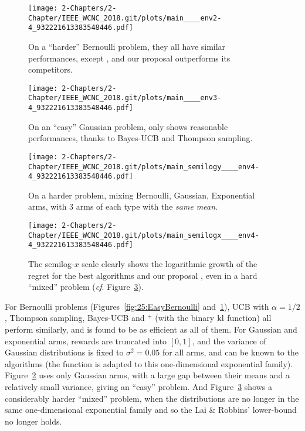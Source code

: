 \begin{figure}[h!]  %
	\centering
	\texttt{[image: 2-Chapters/2-Chapter/IEEE\_WCNC\_2018.git/plots/main\_\_\_\_env2-4\_932221613383548446.pdf]}
	\caption{On a ``harder'' Bernoulli problem, they all have similar performances, except \LearnExp, and our proposal \Aggr{} outperforms its competitors.}
	\label{fig:25:HardBernoulli}
\end{figure}

\begin{figure}[h!]  %
	\centering
	\texttt{[image: 2-Chapters/2-Chapter/IEEE\_WCNC\_2018.git/plots/main\_\_\_\_env3-4\_932221613383548446.pdf]}
	\caption{On an ``easy'' Gaussian problem, only \Aggr{} shows reasonable performances, thanks to Bayes-UCB and Thompson sampling.}
	\label{fig:25:EasyGaussian}
\end{figure}

\begin{figure}[h!]  %
	\centering
	\texttt{[image: 2-Chapters/2-Chapter/IEEE\_WCNC\_2018.git/plots/main\_semilogy\_\_\_\_env4-4\_932221613383548446.pdf]}
	\caption{On a harder problem, mixing Bernoulli, Gaussian, Exponential arms, with 3 arms of each type with the \emph{same mean}.}
	\label{fig:25:HarderMixed}
\end{figure}

\begin{figure}[h!]  %
	\centering
	\texttt{[image: 2-Chapters/2-Chapter/IEEE\_WCNC\_2018.git/plots/main\_semilogx\_\_\_\_env4-4\_932221613383548446.pdf]}
	\caption{The semilog-$x$ scale clearly shows the logarithmic growth of the regret for the best algorithms and our proposal \Aggr, even in a hard ``mixed'' problem (\emph{cf}. Figure~\ref{fig:25:HarderMixed}).}
	\label{fig:25:HarderMixed_semilogx}
\end{figure}

For Bernoulli problems (Figures~\ref{fig:25:EasyBernoulli} and~\ref{fig:25:HardBernoulli}), UCB with $\alpha=1/2$, Thompson sampling, Bayes-UCB and \klUCB{}$^+$ (with the binary $\mathrm{kl}$ function) all perform similarly, and \Aggr{} is found to be as efficient as all of them.
For Gaussian and exponential arms, rewards are truncated into $[0,1]$, and the variance of Gaussian distributions is fixed to $\sigma^2 = 0.05$ for all arms, and can be known to the algorithms (the \kl{} function is adapted to this one-dimensional exponential family).
%
Figure~\ref{fig:25:EasyGaussian} uses only Gaussian arms, with a large gap between their means and a relatively small variance, giving an ``easy'' problem.
%
And Figure~\ref{fig:25:HarderMixed} shows a considerably harder ``mixed'' problem, when the distributions are no longer in the same one-dimensional exponential family and so the Lai \& Robbins' lower-bound no longer holds.


